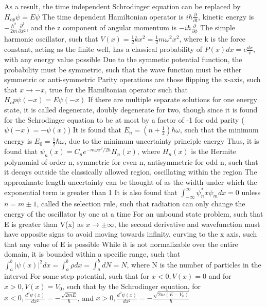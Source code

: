 \documentclass[11 pt, twoside]{article}
\newenvironment{outline*}
{
	\begin{outline}[enumerate]
	}
	{\end{outline}
}
\begin{document}
\begin{outline*}
			\4 As a result, the time independent Schrodinger equation can be replaced by $H_{op}\psi = E\psi$
		\3 The time dependent Hamiltonian operator is $i\hbar \frac{\partial}{\partial t}$, kinetic energy is $-\frac{\hbar^2}{2m}\frac{\partial^2}{\partial x^2}$, and the z component of angular momentum is $-i\hbar \frac{\partial}{\partial \phi}$
\1 The simple harmonic oscillator, such that $V(x) = \frac{1}{2}kx^2 = \frac{1}{2}m\omega^2x^2$, where k is the force constant, acting as the finite well, has a classical probability of $P(x)dx = c\frac{dx}{v}$, with any energy value possible
	\2 Due to the symmetic potential function, the probability must be symmetric, such that the wave function must be either symmetric or anti-symmetric
		\3 Parity operations are those flipping the x-axis, such that $x \to -x$, true for the Hamiltonian operator such that $H_op\psi(-x) = E\psi(-x)$
		\3 If there are multiple separate solutions for one energy state, it is called degenerate, doubly degenerate for two, though since it is found for the Schrodinger equation to be at most by a factor of -1 for odd parity ($\psi(-x) = -\psi(x)$)
	\2 It is found that $E_n = (n + \frac{1}{2})\hbar\omega$, such that the minimum energy is $E_0 = \frac{1}{2}\hbar\omega$, due to the minimum uncertainty principle energy
		\3 Thus, it is found that $\psi_n(x) = C_n e^{-m\omega x^2/2\hbar}H_n(x)$, where $H_n(x)$ is the Hermite polynomial of order n, symmetric for even n, antisymmetric for odd n, such that it decays outside the classically allowed region, oscillating within the region
		\3 The approximate length uncertainty can be thought of as the width under which the exponential term is greater than 1
	\2 It is also found that $\int^{\infty}_{-\infty} \psi^*_nx\psi_mdx = 0$ unless $n = m \pm 1$, called the selection rule, such that radiation can only change the energy of the oscillator by one at a time
\1 For an unbound state problem, such that E is greater than V(x) as $x \to \pm \infty$, the second derivative and wavefunction must have opposite signs to avoid moving towards infinity, curving to the x axis, such that any value of E is possible
	\2 While it is not normalizable over the entire domain, it is bounded within a specific range, such that $\int^b_a |\psi(x)|^2dx = \int^b_a \rho dx = \int^b_a dN = N$, where N is the number of particles in the interval
	\2 For some step potential, such that for $x < 0, V(x) = 0$ and for $x > 0, V(x) = V_0$, such that by the Schrodinger equation, for $x < 0, \frac{d^2\psi(x)}{dx^2} = -\frac{\sqrt{2mE}}{\hbar}$, and $x > 0, \frac{d^2\psi(x)}{dx^2} = -\frac{\sqrt{2m(E - V_0)}}{\hbar}$

\end{outline*}
\end{document}
